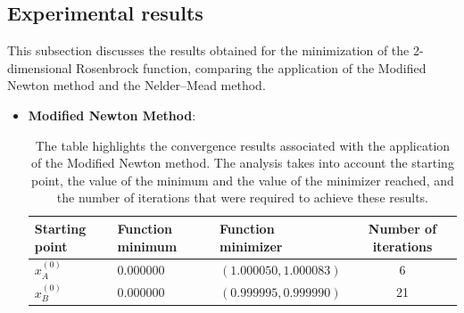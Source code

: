 \documentclass[a4paper,12pt]{article}
\begin{document}
	\vspace{1em}
	
	
	\vspace{1em}
	
	\newpage
	
	\subsection{Experimental results}
	This subsection discusses the results obtained for the minimization of the 2-dimensional Rosenbrock function, comparing the application of the  Modified Newton method and the Nelder--Mead method.\\
	
	
\begin{itemize}	
	\item \textbf{Modified Newton Method}:
	
	\begin{table}[H]
		\begin{tabular}{lllc}
			\hline
			Starting point  & Function minimum & Function minimizer    & Number of iterations \\ \hline
			\( x^{(0)}_A \) & 0.000000                 & $(1.000050,1.000083)$ & 6                    \\ \hline
			\( x^{(0)}_B \) & 0.000000         & $(0.999995,0.999990)$ & 21                   \\ \hline
		\end{tabular}
		\caption{The table highlights the convergence results associated with the application of the Modified Newton method. The analysis takes into account the starting point, the value of the minimum and the value of the minimizer reached, and the number of iterations that were required to achieve these results.}
	\end{table}
	

\end{itemize}
\end{document}
